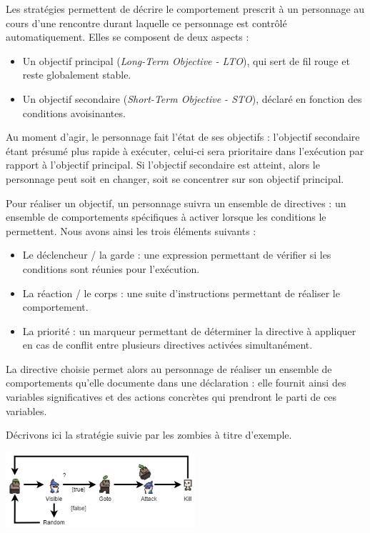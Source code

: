 \documentclass[oneside,a4paper]{book}
\begin{document}
Les stratégies permettent de décrire le comportement prescrit à un personnage au cours d'une rencontre durant laquelle ce personnage est contrôlé automatiquement.
Elles se composent de deux aspects :
\begin{itemize}
    \item Un objectif principal (\textit{Long-Term Objective - LTO}), qui sert de fil rouge et reste globalement stable.
    \item Un objectif secondaire (\textit{Short-Term Objective - STO}), déclaré en fonction des conditions avoisinantes.
\end{itemize}

Au moment d'agir, le personnage fait l'état de ses objectifs : l'objectif secondaire étant présumé plus rapide à exécuter, celui-ci sera prioritaire dans l'exécution par rapport à l'objectif principal. Si l'objectif secondaire est atteint, alors le personnage peut soit en changer, soit se concentrer sur son objectif principal.\newline

Pour réaliser un objectif, un personnage suivra un ensemble de directives : un ensemble de comportements spécifiques à activer lorsque les conditions le permettent.
Nous avons ainsi les trois éléments suivants :
\begin{itemize}
    \item Le déclencheur / la garde : une expression permettant de vérifier si les conditions sont réunies pour l'exécution.
    \item La réaction / le corps : une suite d'instructions permettant de réaliser le comportement.
    \item La priorité : un marqueur permettant de déterminer la directive à appliquer en cas de conflit entre plusieurs directives activées simultanément. 
\end{itemize}

La directive choisie permet alors au personnage de réaliser un ensemble de comportements qu'elle documente dans une déclaration : elle fournit ainsi des variables significatives et des actions concrètes qui prendront le parti de ces variables.\newline

\begin{samepage}
Décrivons ici la stratégie suivie par les zombies à titre d'exemple.

\begin{center}
    \includegraphics[width=7cm,keepaspectratio]{Images/Pseudo-activity.png}
\end{center}
\end{samepage}
\end{document}
